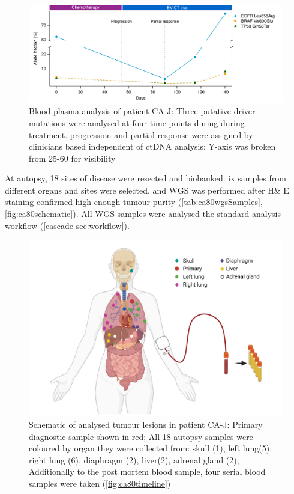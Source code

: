 \begin{figure}[htbp]
\centering
\includegraphics[width=.99\linewidth]{Figures/CASCADE/CA80/CA80_ddPCRduringEVICT}
\caption[Blood plasma analysis of patient CA-J]{Blood plasma analysis of patient CA-J: Three putative driver mutations were analysed at four time points during during treatment. progression and partial response were assigned by clinicians based independent of ctDNA analysis; Y-axis was broken from 25-60 for visibility} \label{fig:ca80plasma}
\end{figure}


At autopsy, 18 sites of disease were resected and biobanked. ix  samples from different organs and sites were selected, and WGS was performed after H\& E staining confirmed high enough tumour purity (\autoref{tab:ca80wgsSamples}, \autoref{fig:ca80schematic}). All WGS samples were analysed  the standard analysis workflow (\autoref{cascade-sec:workflow}).


\begin{figure}[ht]
\centering
\includegraphics[width=.99\linewidth]{Figures/CASCADE/CA80/CA-J_schematic_CA80_organColours}
\caption[Schematic of analysed tumour lesions in patient CA-J]{Schematic of analysed tumour lesions in patient CA-J: Primary diagnostic sample shown in red; All 18 autopsy samples were coloured by organ they were collected from: skull (1), left lung(5), right lung (6), diaphragm (2), liver(2), adrenal gland (2); Additionally to the post mortem blood sample, four serial blood samples were taken (\protect\autoref{fig:ca80timeline})} \label{fig:ca80schematic}
\end{figure}

